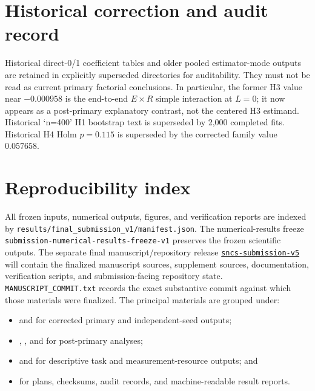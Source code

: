 \documentclass[pdflatex,sn-basic,Numbered]{sn-jnl}
\begin{document}
\section{Historical correction and audit record}

Historical direct-0/1 coefficient tables and older pooled estimator-mode outputs are retained in explicitly superseded directories for auditability. They must not be read as current primary factorial conclusions. In particular, the former H3 value near $-0.000958$ is the end-to-end $E\times R$ simple interaction at $L=0$; it now appears as a post-primary explanatory contrast, not the centered H3 estimand. Historical `n=400' H1 bootstrap text is superseded by 2,000 completed fits. Historical H4 Holm $p=0.115$ is superseded by the corrected family value $0.057658$.

\section{Reproducibility index}

All frozen inputs, numerical outputs, figures, and verification reports are indexed by
\texttt{results/final\_submission\_v1/manifest.json}. The numerical-results freeze
\nolinkurl{submission-numerical-results-freeze-v1} preserves the frozen scientific outputs. The separate final manuscript/repository release
\href{https://github.com/Brandon-Shen/few-qubit-qnn-snr/releases/tag/sncs-submission-v5}{\texttt{sncs-submission-v5}}
will contain the finalized manuscript sources, supplement sources, documentation, verification scripts, and submission-facing repository state. \texttt{MANUSCRIPT\_COMMIT.txt} records the exact substantive commit against which those materials were finalized. The principal materials are grouped under:
\begin{itemize}
\item {} and  for corrected primary and independent-seed outputs;
\item {}, , and  for post-primary analyses;
\item {} and  for descriptive task and measurement-resource outputs; and
\item {} for plans, checksums, audit records, and machine-readable result reports.
\end{itemize}
\end{document}
